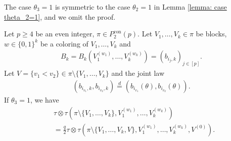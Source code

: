 \documentclass[12pt,reqno]{amsart}
\theoremstyle{plain}
\newcommand{\1}{\mathbf{1}}
\begin{document}
The case $\theta_3=1$ is symmetric to the case $\theta_2=1$ in Lemma \ref{lemma: case theta_2=1}, and we omit the proof.
\begin{lemma}[Case $\theta_3=1$]\label{lemma: case theta_3=1}
    Let $p \ge 4$ be an even integer, $\pi \in P_2^{\operatorname{con}}(p)$. Let $V_1,\ldots,V_k \in \pi$ be blocks, $w \in \{0,1\}^k$ be a coloring of $V_1,\ldots,V_k$ and
    \begin{align*}
        B_k=B_k\left(V_1^{(w_1)},\ldots,V_k^{(w_k)}\right)=\left(b_{i_j,k}\right)_{j \in [p]}.
    \end{align*}
    Let $V=\{v_1<v_2\} \in \pi\setminus \{V_1,\ldots,V_{k}\}$ and the joint law 
    \begin{align*}
        \left(b_{i_{v_1},k},b_{i_{v_2},k}\right)\overset{d}{=}\left(b_{i_{v_1}}(\theta),b_{i_{v_2}}(\theta)\right).
    \end{align*}
    If $\theta_3=1$, we have
    \begin{align*}
        &\tau\otimes\tau \left(\pi\setminus \{V_1,\ldots,V_{k}\},V_1^{(w_1)},\ldots,V_{k}^{(w_{k})}\right)\\
        &=\frac{q}{2}\tau\otimes\tau \left(\pi\setminus \{V_1,\ldots,V_{k},V\},V_1^{(w_1)},\ldots,V_{k}^{(w_{k})},V^{(0)}\right).
    \end{align*}
\end{lemma}
\end{document}
